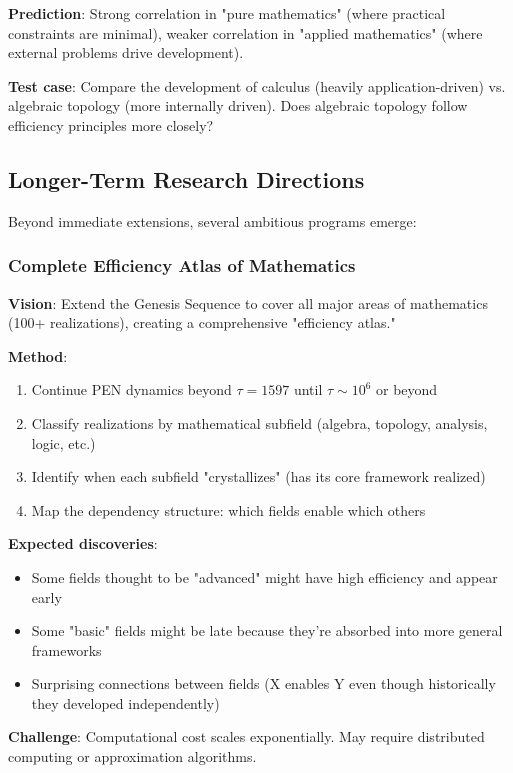 \documentclass[11pt]{article}
\theoremstyle{definition}
\begin{document}
\textbf{Prediction}: Strong correlation in "pure mathematics" (where practical constraints are minimal), weaker correlation in "applied mathematics" (where external problems drive development).

\textbf{Test case}: Compare the development of calculus (heavily application-driven) vs. algebraic topology (more internally driven). Does algebraic topology follow efficiency principles more closely?

\subsection{Longer-Term Research Directions}

Beyond immediate extensions, several ambitious programs emerge:

\subsubsection{Complete Efficiency Atlas of Mathematics}

\textbf{Vision}: Extend the Genesis Sequence to cover all major areas of mathematics (100+ realizations), creating a comprehensive "efficiency atlas."

\textbf{Method}:
\begin{enumerate}
\item Continue PEN dynamics beyond $\tau=1597$ until $\tau \sim 10^6$ or beyond
\item Classify realizations by mathematical subfield (algebra, topology, analysis, logic, etc.)
\item Identify when each subfield "crystallizes" (has its core framework realized)
\item Map the dependency structure: which fields enable which others
\end{enumerate}

\textbf{Expected discoveries}:
\begin{itemize}
\item Some fields thought to be "advanced" might have high efficiency and appear early
\item Some "basic" fields might be late because they're absorbed into more general frameworks
\item Surprising connections between fields (X enables Y even though historically they developed independently)
\end{itemize}

\textbf{Challenge}: Computational cost scales exponentially. May require distributed computing or approximation algorithms.
\end{document}
